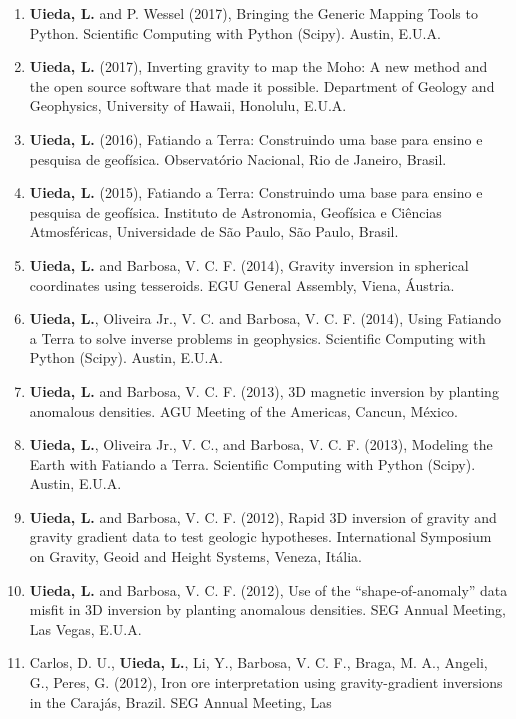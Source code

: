 \begin{enumerate}
\item \textbf{Uieda, L.} and P. Wessel (2017), Bringing the Generic Mapping
    Tools to Python. Scientific Computing with Python (Scipy). Austin, E.U.A.
\item \textbf{Uieda, L.} (2017), Inverting gravity to map the Moho: A new
    method and the open source software that made it possible. Department of
    Geology and Geophysics, University of Hawaii, Honolulu, E.U.A.
\item \textbf{Uieda, L.} (2016), Fatiando a Terra: Construindo uma base para
    ensino e pesquisa de geofísica. Observatório Nacional, Rio de Janeiro,
    Brasil.
\item \textbf{Uieda, L.} (2015), Fatiando a Terra: Construindo uma base para
    ensino e pesquisa de geofísica. Instituto de Astronomia, Geofísica e
    Ciências Atmosféricas, Universidade de São Paulo, São Paulo, Brasil.
\item \textbf{Uieda, L.} and Barbosa, V. C. F. (2014), Gravity inversion in
    spherical coordinates using tesseroids. EGU General Assembly, Viena,
    Áustria.
\item \textbf{Uieda, L.}, Oliveira Jr., V. C. and Barbosa, V. C. F.  (2014),
    Using Fatiando a Terra to solve inverse problems in geophysics. Scientific
    Computing with Python (Scipy). Austin, E.U.A.
\item \textbf{Uieda, L.} and Barbosa, V. C. F. (2013), 3D magnetic inversion by
    planting anomalous densities. AGU Meeting of the Americas, Cancun, México.
\item \textbf{Uieda, L.}, Oliveira Jr., V. C., and Barbosa, V. C. F.  (2013),
    Modeling the Earth with Fatiando a Terra. Scientific Computing with Python
    (Scipy). Austin, E.U.A.
\item \textbf{Uieda, L.} and Barbosa, V. C. F. (2012), Rapid 3D inversion of
    gravity and gravity gradient data to test geologic hypotheses.
    International Symposium on Gravity, Geoid and Height Systems, Veneza,
    Itália.
\item \textbf{Uieda, L.} and Barbosa, V. C. F. (2012), Use of the
    ``shape-of-anomaly'' data misfit in 3D inversion by planting anomalous
    densities. SEG Annual Meeting, Las Vegas, E.U.A.
\item Carlos, D. U., \textbf{Uieda, L.}, Li, Y., Barbosa, V. C. F., Braga, M.
    A., Angeli, G., Peres, G. (2012), Iron ore interpretation using
    gravity-gradient inversions in the Carajás, Brazil. SEG Annual Meeting, Las

\end{enumerate}
